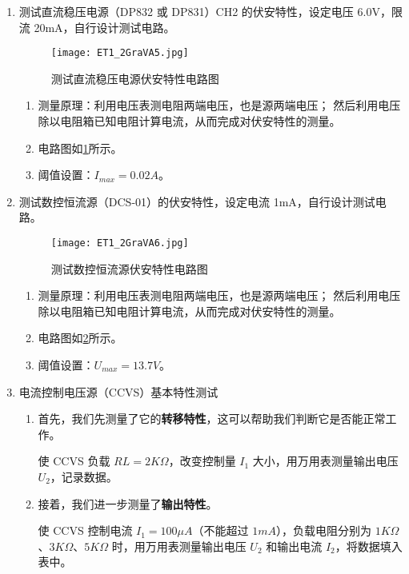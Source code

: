 \documentclass[dvipsnames, svgnames,a4paper,11pt]{article}
\begin{document}
\begin{enumerate}
		\item 测试直流稳压电源（DP832 或 DP831）CH2 的伏安特性，设定电压 6.0V，限流 20mA，自行设计测试电路。
		
			\begin{figure}[htbp]
				\centering
				\texttt{[image: ET1\_2GraVA5.jpg]}
				\caption{测试直流稳压电源伏安特性电路图}
				\label{fig:figdata-5}
			\end{figure}

		\begin{enumerate}
			\item 测量原理：利用电压表测电阻两端电压，也是源两端电压；
			然后利用电压除以电阻箱已知电阻计算电流，从而完成对伏安特性的测量。
			\item 电路图如\cref{fig:figdata-5}所示。
			\item 阈值设置：$I_{max}=0.02A$。
		\end{enumerate}
		
		\item 测试数控恒流源（DCS-01）的伏安特性，设定电流 1mA，自行设计测试电路。
		
			\begin{figure}[htbp]
				\centering
				\texttt{[image: ET1\_2GraVA6.jpg]}
				\caption{测试数控恒流源伏安特性电路图}
				\label{fig:figdata-6}
			\end{figure}

		\begin{enumerate}
			\item 测量原理：利用电压表测电阻两端电压，也是源两端电压；
			然后利用电压除以电阻箱已知电阻计算电流，从而完成对伏安特性的测量。
			\item 电路图如\cref{fig:figdata-6}所示。
			\item 阈值设置：$U_{max}=13.7V$。
		\end{enumerate}
		
		\item 电流控制电压源（CCVS）基本特性测试
		\begin{enumerate}
		\item 首先，我们先测量了它的\textbf{转移特性}，这可以帮助我们判断它是否能正常工作。
		
		使 CCVS 负载 \(RL = 2K\Omega\)，改变控制量 \(I_1\) 大小，用万用表测量输出电压 \(U_2\)，记录数据。
				
		\item 接着，我们进一步测量了\textbf{输出特性}。
		
		使 CCVS 控制电流 \(I_1=100\mu A\)（不能超过 \(1mA\)），负载电阻分别为 \(1K\Omega\)、\(3K\Omega\)、\(5K\Omega\) 时，用万用表测量输出电压 \(U_2\) 和输出电流 \(I_2\)，将数据填入表中。
		\end{enumerate}
	\end{enumerate}	
	
\end{document}
